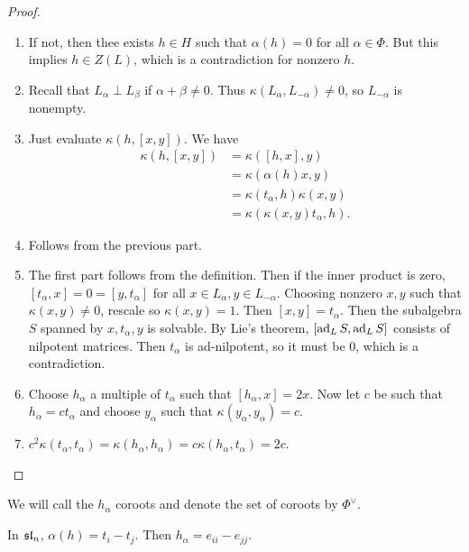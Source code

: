 \documentclass[twoside, 10pt]{article}
\begin{document}
    \begin{proof} \begin{enumerate} \item If not, then thee exists $h \in H$
        such that $\alpha(h) = 0$ for all $\alpha \in \Phi$. But this implies
        $h \in Z(L)$, which is a contradiction for nonzero $h$.  \item Recall
        that $L_{\alpha} \perp L_{\beta}$ if $\alpha + \beta \neq 0$. Thus
        $\kappa(L_{\alpha}, L_{-\alpha}) \neq 0$, so $L_{-\alpha}$ is nonempty.
    \item Just evaluate $\kappa(h,[x,y])$. We have \begin{align*}
            \kappa(h,[x,y]) &= \kappa([h,x],y) \\ &= \kappa(\alpha(h)x,y) \\ &=
            \kappa(t_{\alpha},h) \kappa(x,y) \\ &=
        \kappa(\kappa(x,y)t_{\alpha},h).  \end{align*} \item Follows from the
        previous part.  \item The first part follows from the definition. Then
        if the inner product is zero, $[t_{\alpha},x] = 0 = [y,t_{\alpha}]$ for
        all $x \in L_{\alpha}, y \in L_{-\alpha}$. Choosing nonzero $x,y$ such
        that $\kappa(x,y) \neq 0$, rescale so $\kappa(x,y) = 1$. Then $[x,y] =
        t_{\alpha}$. Then the subalgebra $S$ spanned by $x,t_{\alpha},y$ is
        solvable. By Lie's theorem, $[\operatorname{ad}_L S, \operatorname{ad}_L S]$ consists of nilpotent
        matrices. Then $t_{\alpha}$ is ad-nilpotent, so it must be $0$, which
        is a contradiction.  \item Choose $h_{\alpha}$ a multiple of
        $t_{\alpha}$ such that $[h_{\alpha},x] = 2x$. Now let $c$ be such that
        $h_{\alpha} = ct_{\alpha}$ and choose $y_{\alpha}$ such that
        $\kappa(y_{\alpha},y_{\alpha}) = c$.  \item
$c^2\kappa(t_{\alpha},t_{\alpha}) = \kappa(h_{\alpha},h_{\alpha}) = c
\kappa(h_{\alpha},t_{\alpha}) = 2c$.  \end{enumerate} \end{proof}

    We will call the $h_{\alpha}$ coroots and denote the set of coroots by
    $\Phi^{\vee}$.

    \begin{exm} In $\mathfrak{sl}_n$, $\alpha(h) = t_i - t_j$. Then $h_{\alpha} =
    e_{ii} - e_{jj}$.  \end{exm}
\end{document}
